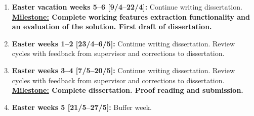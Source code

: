 \documentclass[12pt]{article}
\begin{document}
\begin{enumerate}[leftmargin=*]
	\item \textbf{Easter vacation weeks 5--6 [9/4--22/4]:} Continue writing dissertation.
	\\
	\textbf{\underline{Milestone:} Complete working features extraction functionality and an evaluation of the solution. First draft of dissertation.}
	
	\item \textbf{Easter weeks 1--2 [23/4--6/5]:}  Continue writing dissertation. Review cycles with feedback from supervisor and corrections to dissertation.

	\item \textbf{Easter weeks 3--4 [7/5--20/5]:}  Continue writing dissertation. Review cycles with feedback from supervisor and corrections to dissertation.
	\\
	\textbf{\underline{Milestone:} Complete dissertation. Proof reading and submission.}
	
	\item \textbf{Easter weeks 5 [21/5--27/5]:} Buffer week.
\end{enumerate}


\pagestyle{plain}


\end{document}
